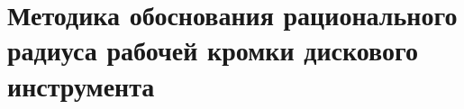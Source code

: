 \chapter{Методика обоснования рационального радиуса рабочей кромки дискового инструмента} \label{chapt4}